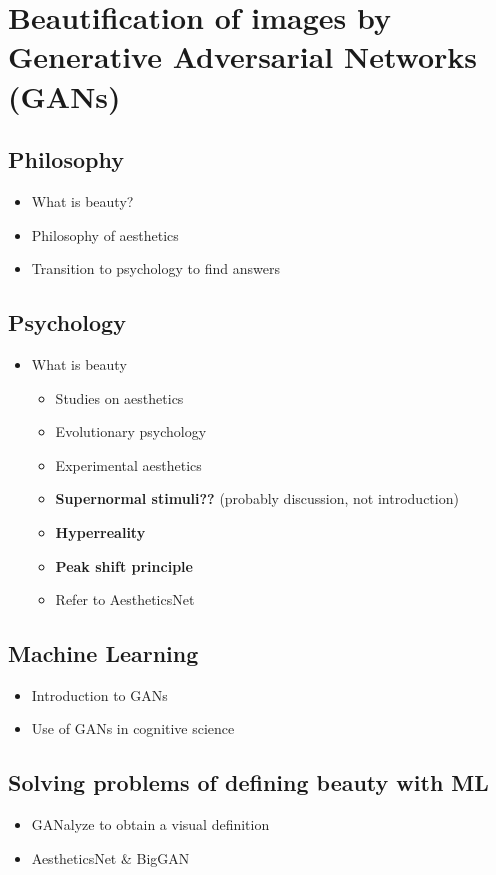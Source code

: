 \documentclass[../main.tex]{subfiles}
\begin{document}
\section{Beautification of images by Generative Adversarial Networks (GANs)}

	\subsection{Philosophy}
		\begin{itemize}
			\item What is beauty?
			\item Philosophy of aesthetics
			\item Transition to psychology to find answers
		\end{itemize}
	
	\subsection{Psychology}
		\begin{itemize}
			\item What is beauty
			\begin{itemize}
				\item Studies on aesthetics
				\item Evolutionary psychology
				\item Experimental aesthetics
				\item \textbf{Supernormal stimuli??} (probably discussion, not introduction)
				\item \textbf{Hyperreality}
				\item \textbf{Peak shift principle}
				\item Refer to AestheticsNet
			\end{itemize}
		\end{itemize}
	
	\subsection{Machine Learning}
		\begin{itemize}
			\item Introduction to GANs
			\item Use of GANs in cognitive science
		\end{itemize}

	\subsection{Solving problems of defining beauty with ML}
		\begin{itemize}
			\item GANalyze to obtain a visual definition
			\item AestheticsNet \& BigGAN
		\end{itemize}
\end{document}
